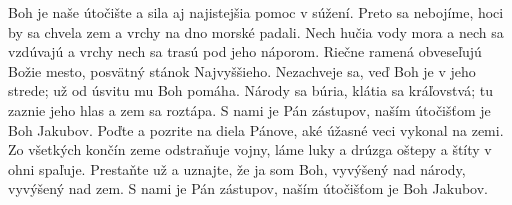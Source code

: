 Boh je naše útočište a sila
aj najistejšia pomoc v súžení.
\versseparator
Preto sa nebojíme, hoci by sa chvela zem
a vrchy na dno morské padali.
\versseparator
Nech hučia vody mora a nech sa vzdúvajú
a vrchy nech sa trasú pod jeho náporom.
\versseparator
Riečne ramená obveseľujú Božie mesto,
posvätný stánok Najvyššieho.
\versseparator
Nezachveje sa, veď Boh je v jeho strede;
už od úsvitu mu Boh pomáha.
\versseparator
Národy sa búria, klátia sa kráľovstvá;
tu zaznie jeho hlas a zem sa roztápa.
\versseparator
S nami je Pán zástupov,
naším útočišťom je Boh Jakubov.
\versseparator
Poďte a pozrite na diela Pánove,
aké úžasné veci vykonal na zemi.
Zo všetkých končín zeme odstraňuje vojny,
\versseparator
láme luky a drúzga oštepy
a štíty v ohni spaľuje.
\versseparator
Prestaňte už a uznajte, že ja som Boh,
vyvýšený nad národy, vyvýšený nad zem.
\versseparator
S nami je Pán zástupov,
naším útočišťom je Boh Jakubov.